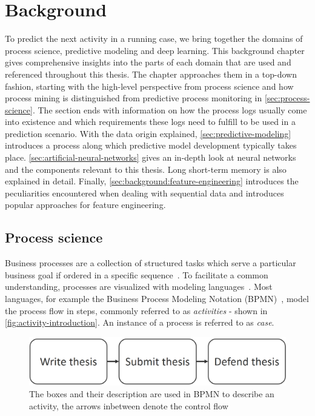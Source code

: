 \chapter{Background}\label{chap:background}
To predict the next activity in a running case, we bring together the domains of process science, predictive modeling and deep learning. This background chapter gives comprehensive insights into the parts of each domain that are used and referenced throughout this thesis. The chapter approaches them in a top-down fashion, starting with the high-level perspective from process science and how process mining is distinguished from predictive process monitoring in \autoref{sec:process-science}. The section ends with information on how the process logs usually come into existence and which requirements these logs need to fulfill to be used in a prediction scenario.
With the data origin explained, \autoref{sec:predictive-modeling} introduces a process along which predictive model development typically takes place.
\autoref{sec:artificial-neural-networks} gives an in-depth look at neural networks and the components relevant to this thesis.
Long short-term memory is also explained in detail.
Finally, \autoref{sec:background:feature-engineering} introduces the peculiarities encountered when dealing with sequential data and introduces popular approaches for feature engineering.

\section{Process science}\label{sec:process-science}
Business processes are a collection of structured tasks which serve a particular business goal if ordered in a specific sequence~\cite{weske2012business}. To facilitate a common understanding, processes are visualized with modeling languages~\cite{panagacos2012ultimate}. Most languages, for example the Business Process Modeling Notation (BPMN)~\cite{bpmn2.0}, model the process flow in steps, commonly referred to as \textit{activities} - shown in \autoref{fig:activity-introduction}. An instance of a process is referred to as \textit{case}.

\begin{figure}[!htb]
    \centering
    \includegraphics[width=.75\textwidth]{gfx/activity-sequence.png}
    \caption[Control flow in BPMN]{The boxes and their description are used in BPMN to describe an activity, the arrows inbetween denote the control flow}
    \label{fig:activity-introduction}
\end{figure}

